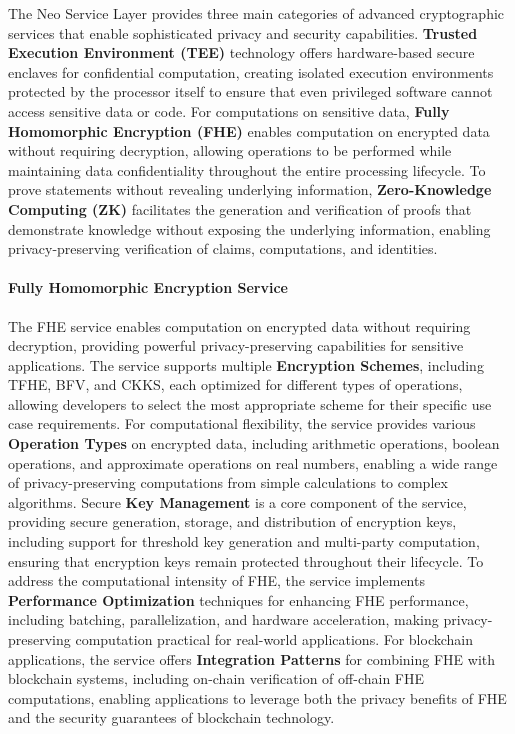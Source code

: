 \documentclass[11pt]{article}
\begin{document}
The Neo Service Layer provides three main categories of advanced cryptographic services that enable sophisticated privacy and security capabilities. \textbf{Trusted Execution Environment (TEE)} technology offers hardware-based secure enclaves for confidential computation, creating isolated execution environments protected by the processor itself to ensure that even privileged software cannot access sensitive data or code. For computations on sensitive data, \textbf{Fully Homomorphic Encryption (FHE)} enables computation on encrypted data without requiring decryption, allowing operations to be performed while maintaining data confidentiality throughout the entire processing lifecycle. To prove statements without revealing underlying information, \textbf{Zero-Knowledge Computing (ZK)} facilitates the generation and verification of proofs that demonstrate knowledge without exposing the underlying information, enabling privacy-preserving verification of claims, computations, and identities.

\paragraph{Fully Homomorphic Encryption Service}
The FHE service enables computation on encrypted data without requiring decryption, providing powerful privacy-preserving capabilities for sensitive applications. The service supports multiple \textbf{Encryption Schemes}, including TFHE, BFV, and CKKS, each optimized for different types of operations, allowing developers to select the most appropriate scheme for their specific use case requirements. For computational flexibility, the service provides various \textbf{Operation Types} on encrypted data, including arithmetic operations, boolean operations, and approximate operations on real numbers, enabling a wide range of privacy-preserving computations from simple calculations to complex algorithms. Secure \textbf{Key Management} is a core component of the service, providing secure generation, storage, and distribution of encryption keys, including support for threshold key generation and multi-party computation, ensuring that encryption keys remain protected throughout their lifecycle. To address the computational intensity of FHE, the service implements \textbf{Performance Optimization} techniques for enhancing FHE performance, including batching, parallelization, and hardware acceleration, making privacy-preserving computation practical for real-world applications. For blockchain applications, the service offers \textbf{Integration Patterns} for combining FHE with blockchain systems, including on-chain verification of off-chain FHE computations, enabling applications to leverage both the privacy benefits of FHE and the security guarantees of blockchain technology.
\end{document}
